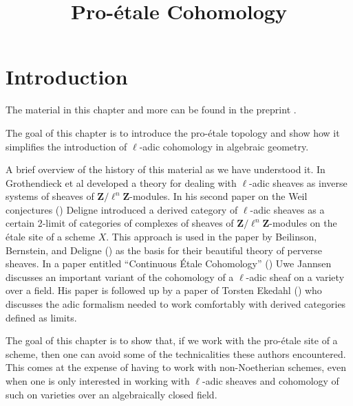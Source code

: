 

%


\title{Pro-\'etale Cohomology}


\maketitle

\label{section-phantom}

\tableofcontents

\section{Introduction}
\label{section-introduction}

\noindent
The material in this chapter and more can be found in the preprint \cite{BS}.

\medskip\noindent
The goal of this chapter is to introduce the pro-\'etale topology and
show how it simplifies the introduction of $\ell$-adic cohomology in
algebraic geometry.

\medskip\noindent
A brief overview of the history of this material as we have understood it.
In \cite[Expos\'es V and VI]{SGA5} Grothendieck et al developed a theory for
dealing with $\ell$-adic sheaves as inverse systems of sheaves of
$\mathbf{Z}/\ell^n\mathbf{Z}$-modules.
In his second paper on the Weil conjectures (\cite{WeilII}) Deligne introduced
a derived category of $\ell$-adic sheaves as a certain 2-limit of categories
of complexes of sheaves of $\mathbf{Z}/\ell^n\mathbf{Z}$-modules on the
\'etale site of a scheme $X$. This approach is used in the paper by
Beilinson, Bernstein, and Deligne (\cite{BBD}) as the basis for their
beautiful theory of perverse sheaves. In a paper entitled ``Continuous
\'Etale Cohomology'' (\cite{Jannsen}) Uwe Jannsen discusses an important
variant of the cohomology of a $\ell$-adic sheaf on a variety over a field.
His paper is followed up by a paper of Torsten Ekedahl (\cite{Ekedahl})
who discusses the adic formalism needed to work comfortably with derived
categories defined as limits.

\medskip\noindent
The goal of this chapter is to show that, if we work with the pro-\'etale
site of a scheme, then one can avoid some of the technicalities these
authors encountered. This comes at the expense of having to work with
non-Noetherian schemes, even when one is only interested in working with
$\ell$-adic sheaves and cohomology of such on varieties over an
algebraically closed field.




